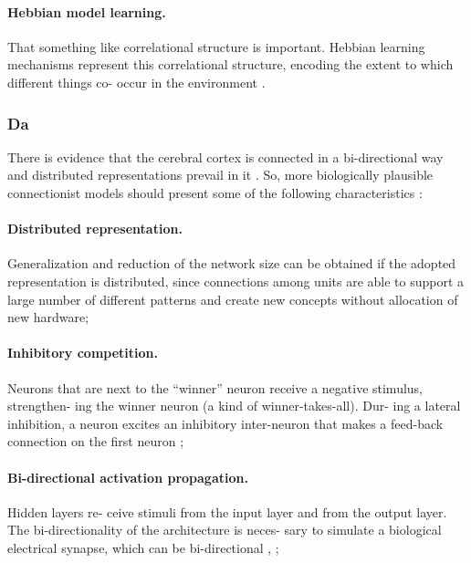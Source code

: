 \paragraph{Hebbian model learning.} That something like correlational structure is important.
Hebbian learning mechanisms represent this correlational
structure, encoding the extent to which different things co-
occur in the environment \cite{hinton1988learning}.

\subsubsection{Da} 

\cite{da2011advances} 

There is evidence that the cerebral cortex is connected in a
bi-directional way and distributed representations prevail in
it \cite{o2000computational}. So, more biologically plausible connectionist models
should present some of the following characteristics \cite{orru2008sabio}:

\paragraph{Distributed representation.} Generalization and reduction
of the network size can be obtained if the adopted
representation is distributed, since connections among
units are able to support a large number of different
patterns and create new concepts without allocation of
new hardware;

\paragraph{Inhibitory competition.} Neurons that are next to the
“winner” neuron receive a negative stimulus, strengthen-
ing the winner neuron (a kind of winner-takes-all). Dur-
ing a lateral inhibition, a neuron excites an inhibitory
inter-neuron that makes a feed-back connection on the
first neuron \cite{o1998six};

\paragraph{Bi-directional activation propagation.} Hidden layers re-
ceive stimuli from the input layer and from the output
layer. The bi-directionality of the architecture is neces-
sary to simulate a biological electrical synapse, which
can be bi-directional \cite{kandel1995essentials}, \cite{rosa2002biologically};

